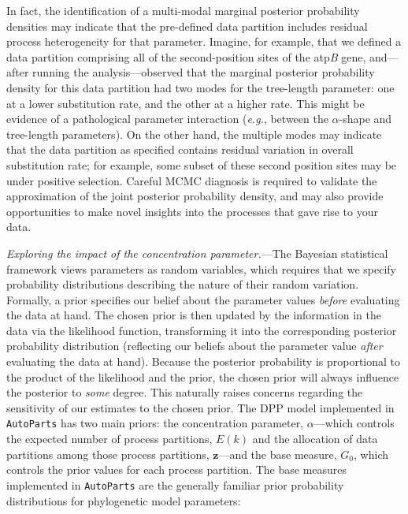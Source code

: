 \documentclass[11pt]{article}
\begin{document}
In fact, the identification of a multi-modal marginal posterior probability densities may indicate that the pre-defined data partition includes residual process heterogeneity for that parameter. 
Imagine, for example, that we defined a data partition comprising all of the second-position sites of the atp\emph{B} gene, and---after running the analysis---observed that the marginal posterior probability density for this data partition had two modes for the tree-length parameter: one at a lower substitution rate, and the other at a higher rate. 
This might be evidence of a pathological parameter interaction ({\it e.g.}, between the $\alpha$-shape and tree-length parameters). 
On the other hand, the multiple modes may indicate that the data partition as specified contains residual variation in overall substitution rate; for example, some subset of these second position sites may be under positive selection. 
Careful MCMC diagnosis is required to validate the approximation of the joint posterior probability density, and may also provide opportunities to make novel insights into the processes that gave rise to your data. \vspace{-1.7mm}

\bigskip
\emph{Exploring the impact of the concentration parameter.}---The Bayesian statistical framework views parameters as random variables, which requires that we specify probability distributions describing the nature of their random variation. 
Formally, a prior specifies our belief about the parameter values \emph{before} evaluating the data at hand. 
The chosen prior is then updated by the information in the data via the likelihood function, transforming it into the corresponding posterior probability distribution (reflecting our beliefs about the parameter value \emph{after} evaluating the data at hand). 
Because the posterior probability is proportional to the product of the likelihood and the prior, the chosen prior will always influence the posterior to \emph{some} degree. 
This naturally raises concerns regarding the sensitivity of our estimates to the chosen prior.
The DPP model implemented in \verb!AutoParts! has two main priors: the concentration parameter, $\alpha$---which controls the expected number of process partitions, $E(k)$ and the allocation of data partitions among those process partitions, ${\mathbf z}$---and the base measure, $G_0$, which controls the prior values for each process partition.
The base measures implemented in \verb!AutoParts! are the generally familiar prior probability distributions for phylogenetic model parameters: \vspace{-5mm}
\end{document}
